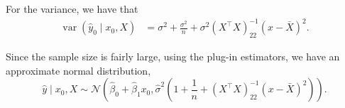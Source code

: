 \documentclass[letterpaper,11pt]{article}
\begin{document}
\begin{enumerate}
\begin{enumerate}
\begin{description}
    For the variance, we have that
    \begin{align*}
      \operatorname{var}\left(
      \hat{y}_0
      \mid x_0, X
      \right)
      &= \sigma^2 + \frac{\sigma^2}{n} + \sigma^2\left(X^\intercal X\right)^{-1}_{22}
        \left(x - \bar{X}\right)^2.
    \end{align*}
    
    Since the sample size is fairly large, using the plug-in estimators, we have
    an approximate normal distribution,
    \begin{equation}
      \hat{y} \mid x_0, X \sim \mathcal{N}\left(
        \hat{\beta}_0 + \hat{\beta}_1x_0,
        \hat{\sigma}^2\left(
          1 + \frac{1}{n} + \left(X^\intercal X\right)^{-1}_{22}\left(x - \bar{X}\right)^2
        \right)
      \right).
    \end{equation}    
  \end{description}
\end{enumerate}
\end{enumerate}
\end{document}
